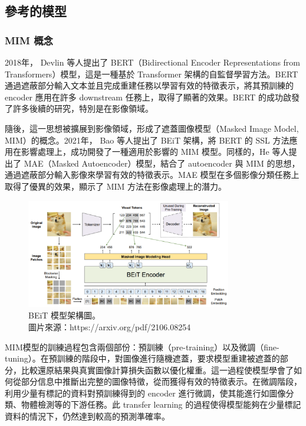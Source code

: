 \documentclass[12pt,a4paper]{article}
\begin{document}
\newpage
\subsection{參考的模型}

\subsubsection{MIM 概念}

2018年， Devlin 等人提出了 BERT（Bidirectional Encoder Representations from Transformers）模型，這是一種基於 Transformer 架構的自監督學習方法。BERT 通過遮蔽部分輸入文本並且完成重建任務以學習有效的特徵表示，將其預訓練的 encoder 應用在許多 downstream 任務上，取得了顯著的效果。BERT 的成功啟發了許多後續的研究，特別是在影像領域。

隨後，這一思想被擴展到影像領域，形成了遮蓋圖像模型（Masked Image Model, MIM）的概念。2021年， Bao 等人提出了 BEiT 架構，將 BERT 的 SSL 方法應用在影響處理上，成功開發了一種適用於影響的 MIM 模型。同樣的，He 等人提出了 MAE（Masked Autoencoder）模型，結合了 autoencoder 與 MIM 的思想，通過遮蔽部分輸入影像來學習有效的特徵表示。MAE 模型在多個影像分類任務上取得了優異的效果，顯示了 MIM 方法在影像處理上的潛力。

\begin{figure}[H]
  \centering
  \includegraphics[width=0.8\textwidth]{src/BEiT.png}
  \centering
  \caption{BEiT 模型架構圖。\\圖片來源：https://arxiv.org/pdf/2106.08254}
  \label{fig:beit-architecture}
\end{figure}


MIM模型的訓練過程包含兩個部份：預訓練（pre-training）以及微調（fine-tuning）。在預訓練的階段中，對圖像進行隨機遮蓋，要求模型重建被遮蓋的部分，比較還原結果與真實圖像計算損失函數以優化權重。這一過程使模型學會了如何從部分信息中推斷出完整的圖像特徵，從而獲得有效的特徵表示。在微調階段，利用少量有標記的資料對預訓練得到的 encoder 進行微調，使其能進行如圖像分類、物體檢測等的下游任務。此 transfer learning 的過程使得模型能夠在少量標記資料的情況下，仍然達到較高的預測準確率。
\end{document}
